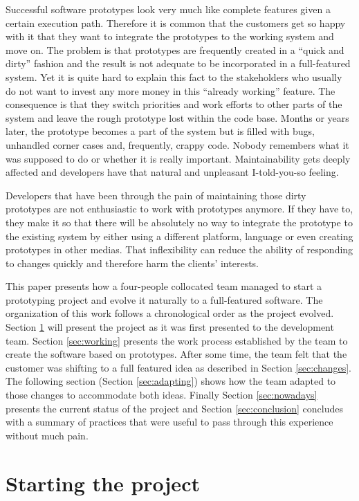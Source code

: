 \documentclass[lnbip]{svmultln}
\begin{document}
Successful software prototypes look very much like complete features
given a certain execution path. Therefore it is common that the
customers get so happy with it that they want to integrate the
prototypes to the working system and move on. The problem is that
prototypes are frequently created in a ``quick and dirty'' fashion and
the result is not adequate to be incorporated in a full-featured
system. Yet it is quite hard to explain this fact to the stakeholders
who usually do not want to invest any more money in this ``already
working'' feature. The consequence is that they switch priorities and
work efforts to other parts of the system and leave the rough
prototype lost within the code base. Months or years later, the
prototype becomes a part of the system but is filled with bugs,
unhandled corner cases and, frequently, crappy code. Nobody remembers
what it was supposed to do or whether it is really
important. Maintainability gets deeply affected and developers have
that natural and unpleasant I-told-you-so feeling. %

Developers that have been through the pain of maintaining those dirty
prototypes are not enthusiastic to work with prototypes anymore. If
they have to, they make it so that there will be absolutely no way to
integrate the prototype to the existing system by either using a
different platform, language or even creating prototypes in other
medias. That inflexibility can reduce the ability of responding to
changes quickly and therefore harm the clients' interests.

This paper presents how a four-people collocated team managed to start
a prototyping project and evolve it naturally to a full-featured
software. The organization of this work follows a chronological order
as the project evolved. Section \ref{sec:start} will present the
project as it was first presented to the development team. Section
\ref{sec:working} presents the work process established by the team to
create the software based on prototypes.  After some time, the team
felt that the customer was shifting to a full featured idea as
described in Section \ref{sec:changes}. The following section (Section
\ref{sec:adapting}) shows how the team adapted to those changes to
accommodate both ideas. Finally Section \ref{sec:nowadays} presents the
current status of the project and Section \ref{sec:conclusion}
concludes with a summary of practices that were useful to pass through
this experience without much pain.

\section{Starting the project}
\label{sec:start}
\end{document}
